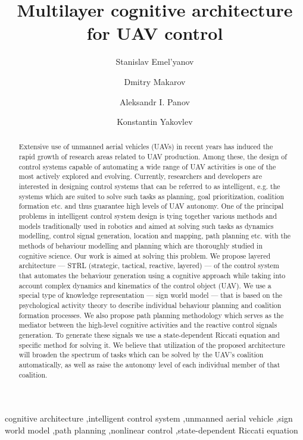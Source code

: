 \documentclass[review]{elsarticle}
\begin{document}
\begin{frontmatter}

\title{Multilayer cognitive architecture for UAV control}

\author{Stanislav Emel'yanov}
\author{Dmitry Makarov}
\author{Aleksandr I. Panov}
\author{Konstantin Yakovlev}

\address{Federal Research Center ``Computer Science and Control'' of RAS\\pr. 60-letiya Octyabrya 9, Moscow, Russia}

\begin{abstract}
Extensive use of unmanned aerial vehicles (UAVs) in recent years has induced the rapid growth of research areas related to UAV production. Among these, the design of control systems capable of automating a wide range of UAV activities is one of the most actively explored and evolving. Currently, researchers and developers are interested in designing control systems that can be referred to as intelligent, e.g. the systems which are suited to solve such tasks as planning, goal prioritization, coalition formation etc. and thus guarantee high levels of UAV autonomy. One of the principal problems in intelligent control system design is tying together various methods and models traditionally used in robotics and aimed at solving such tasks as dynamics modelling, control signal generation, location and mapping, path planning etc. with the methods of behaviour modelling and planning which are thoroughly studied in cognitive science. Our work is aimed at solving this problem. We propose layered architecture --- STRL (strategic, tactical, reactive, layered) --- of the control system that automates the behaviour generation using a cognitive approach while taking into account complex dynamics and kinematics of the control object (UAV). We use a special type of knowledge representation --- sign world model --- that is based on the psychological activity theory to describe individual behaviour planning and coalition formation processes. We also propose path planning methodology which serves as the mediator between the high-level cognitive activities and the reactive control signals generation. To generate these signals we use a state-dependent Riccati equation and specific method for solving it. We believe that utilization of the proposed architecture will broaden the spectrum of tasks which can be solved by the UAV's coalition automatically, as well as raise the autonomy level of each individual member of that coalition.
\end{abstract}

\begin{keyword}
cognitive architecture \sep intelligent control system \sep unmanned aerial vehicle \sep sign world model \sep path planning \sep nonlinear control \sep state-dependent Riccati equation
\end{keyword}

\end{frontmatter}
\end{document}
